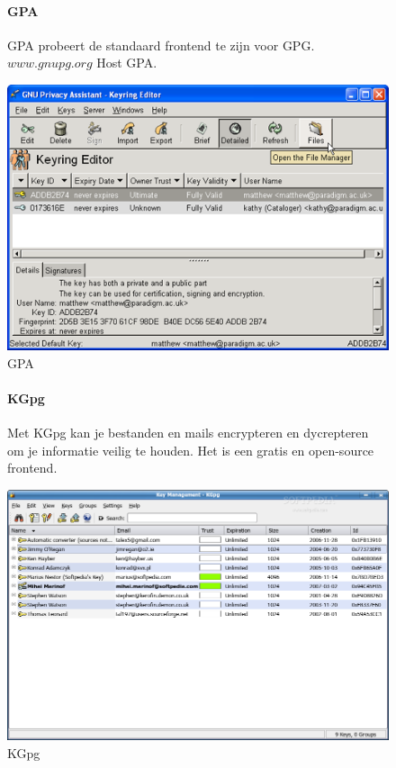 \documentclass[12pt]{article}
\begin{document}
				\begin{figure}[!ht]
					\paragraph{GPA}
						GPA probeert de standaard frontend te zijn voor GPG. $www.gnupg.org$ Host 								GPA.
					\begin{center}
						\includegraphics[scale=0.6]{Pictures/GPA}
					\end{center}
					\caption{GPA}
				\end{figure}	

				\begin{figure}[!ht]
					\paragraph{KGpg}
						Met KGpg kan je bestanden en mails encrypteren en dycrepteren om je 									informatie veilig te houden.
						Het is een gratis en open-source frontend.
					\begin{center}
						\includegraphics[scale=0.3]{Pictures/kgpg}
					\end{center}
					\caption{KGpg}
				\end{figure}	
\end{document}
